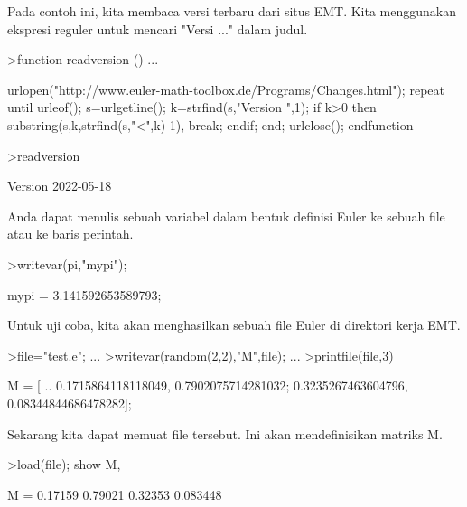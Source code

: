 \documentclass[a4paper,10pt]{article}
\begin{document}
\begin{eulernotebook}
\begin{eulercomment}
\begin{eulercomment}
\begin{eulercomment}
\begin{eulercomment}
\begin{eulercomment}
\begin{eulercomment}
\begin{eulercomment}
Pada contoh ini, kita membaca versi terbaru dari situs EMT. Kita
menggunakan ekspresi reguler untuk mencari "Versi ..." dalam judul.
\end{eulercomment}
\begin{eulerprompt}
>function readversion () ...
\end{eulerprompt}
\begin{eulerudf}
  urlopen("http://www.euler-math-toolbox.de/Programs/Changes.html");
  repeat
    until urleof();
    s=urlgetline();
    k=strfind(s,"Version ",1);
    if k>0 then substring(s,k,strfind(s,"<",k)-1), break; endif;
  end;
  urlclose();
  endfunction
\end{eulerudf}
\begin{eulerprompt}
>readversion
\end{eulerprompt}
\begin{euleroutput}
  Version 2022-05-18
\end{euleroutput}
\begin{eulercomment}
Anda dapat menulis sebuah variabel dalam bentuk definisi Euler ke
sebuah file atau ke baris perintah.
\end{eulercomment}
\begin{eulerprompt}
>writevar(pi,"mypi");
\end{eulerprompt}
\begin{euleroutput}
  mypi = 3.141592653589793;
\end{euleroutput}
\begin{eulercomment}
Untuk uji coba, kita akan menghasilkan sebuah file Euler di direktori
kerja EMT.
\end{eulercomment}
\begin{eulerprompt}
>file="test.e"; ...
>writevar(random(2,2),"M",file); ...
>printfile(file,3)
\end{eulerprompt}
\begin{euleroutput}
  M = [ ..
  0.1715864118118049, 0.7902075714281032;
  0.3235267463604796, 0.08344844686478282];
\end{euleroutput}
\begin{eulercomment}
Sekarang kita dapat memuat file tersebut. Ini akan mendefinisikan
matriks M.
\end{eulercomment}
\begin{eulerprompt}
>load(file); show M,
\end{eulerprompt}
\begin{euleroutput}
  M = 
    0.17159   0.79021 
    0.32353  0.083448 
\end{euleroutput}

\end{eulercomment}
\end{eulercomment}
\end{eulercomment}
\end{eulercomment}
\end{eulercomment}
\end{eulercomment}
\end{eulernotebook}
\end{document}
